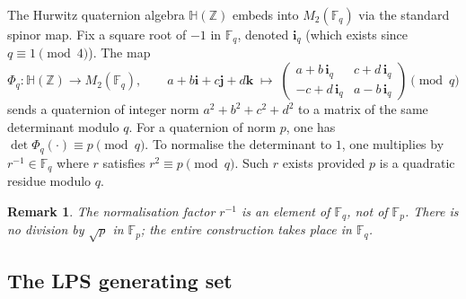 \documentclass[11pt,a4paper]{article}
\newtheorem{remark}{Remark}
\begin{document}
    The Hurwitz quaternion algebra $\mathbb{H}(\mathbb{Z})$ embeds into
    $M_2(\mathbb{F}_q)$ via the standard spinor map.
    Fix a square root of $-1$ in $\mathbb{F}_q$, denoted $\mathbf{i}_q$
    (which exists since $q \equiv 1 \pmod{4}$).
    The map
    \begin{equation}
      \Phi_q \colon \mathbb{H}(\mathbb{Z}) \longrightarrow M_2(\mathbb{F}_q),
      \qquad
      a + b\mathbf{i} + c\mathbf{j} + d\mathbf{k}
      \;\longmapsto\;
      \begin{pmatrix}
        a + b\,\mathbf{i}_q & c + d\,\mathbf{i}_q \\
        -c + d\,\mathbf{i}_q & a - b\,\mathbf{i}_q
      \end{pmatrix}
      \pmod{q}
      \label{eq:spinor-map}
    \end{equation}
    sends a quaternion of integer norm $a^2+b^2+c^2+d^2$ to a matrix of the
    same determinant modulo $q$.
    For a quaternion of norm $p$, one has
    $\det \Phi_q(\cdot) \equiv p \pmod{q}$.
    To normalise the determinant to $1$, one multiplies by $r^{-1} \in
\mathbb{F}_q$ where $r$ satisfies $r^2 \equiv p \pmod{q}$.
    Such $r$ exists provided $p$ is a quadratic residue modulo $q$.

    \begin{remark}
      The normalisation factor $r^{-1}$ is an element of $\mathbb{F}_q$,
      not of $\mathbb{F}_p$.
      There is no division by $\sqrt{p}$ in $\mathbb{F}_p$; the entire
      construction takes place in $\mathbb{F}_q$.
    \end{remark}

  \subsection{The LPS generating set}
    \label{sec:step6a-lps}
\end{document}
